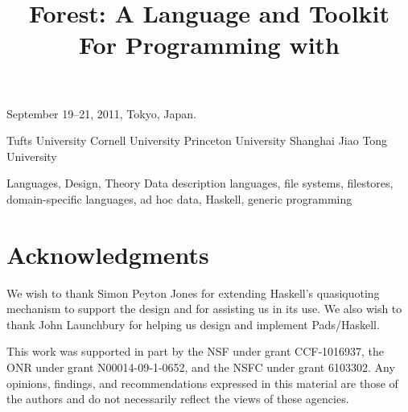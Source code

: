 \documentclass[natbib]{sigplanconf}
\newif\iftr\trfalse              %
\newif\ifappendix\appendixfalse   %
\begin{document}


 {September 19--21, 2011, Tokyo, Japan.}

\title{Forest\iftr{} 1.0\fi: A Language and Toolkit For Programming with \Filestores{}}

	   {Tufts University}{}
           {Cornell University}{}
           {Princeton University}{}
           {Shanghai Jiao Tong University}{}

\maketitle{}

\begin{abstract}  

\end{abstract}

\terms
Languages, Design, Theory
\keywords
Data description languages, file systems, filestores,
domain-specific languages, ad hoc data, Haskell,
generic programming











\section*{Acknowledgments}

We wish to thank Simon Peyton Jones for extending Haskell's
quasiquoting mechanism to support the \forest{} design and for
assisting us in its use. We also wish to thank John Launchbury for
helping us design and implement Pads/Haskell.

This work was supported in part by the NSF under grant CCF-1016937,
the ONR under grant N00014-09-1-0652, and the NSFC under grant
6103302. Any opinions, findings, and recommendations expressed in this
material are those of the authors and do not necessarily reflect the
views of these agencies.


\balance


\ifappendix
\newpage
\appendix
\onecolumn

\closeproofchan
\section{Proofs}

\noindent This appendix contains the proofs of the theorems stated in
Section~\ref{sec:theory}.

\label{sec:proof-appendix}


\newpage

\fi
\end{document}
